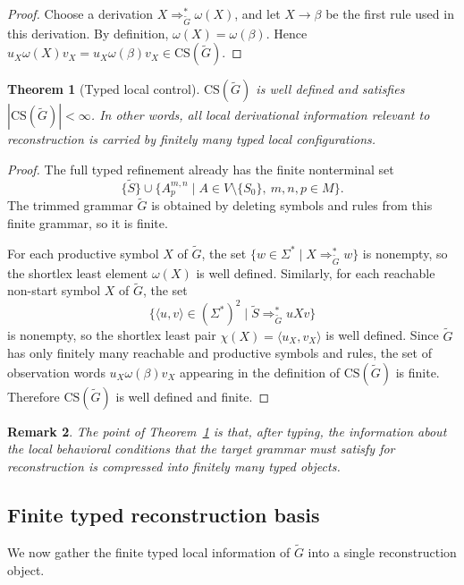 \documentclass[11pt,a4paper]{article}
\newtheorem{theorem}{Theorem}[section]
\newtheorem{remark}[theorem]{Remark}
\newcommand{\CS}{\mathrm{CS}}
\begin{document}
\begin{proof}
Choose a derivation $X\Rightarrow_{\widetilde G}^*\omega(X)$, and let $X\to\beta$ be the first rule used in this derivation. By definition, $\omega(X)=\omega(\beta)$. Hence $u_X\omega(X)v_X=u_X\omega(\beta)v_X\in\CS(\widetilde G)$.
\end{proof}

\begin{theorem}[Typed local control]\label{thm:typed-local-control}
$\CS(\widetilde G)$ is well defined and satisfies $|\CS(\widetilde G)|<\infty$. In other words, all local derivational information relevant to reconstruction is carried by finitely many typed local configurations.
\end{theorem}
\begin{proof}
The full typed refinement already has the finite nonterminal set
\[
  \{\widetilde S\}\cup
  \{A_p^{m,n}\mid A\in V\setminus\{S_0\},\ m,n,p\in M\}.
\]
The trimmed grammar $\widetilde G$ is obtained by deleting symbols and
rules from this finite grammar, so it is finite.

For each productive symbol $X$ of $\widetilde G$, the set
$\{w\in\Sigma^*\mid X\Rightarrow_{\widetilde G}^* w\}$ is nonempty, so
the shortlex least element $\omega(X)$ is well defined. Similarly, for
each reachable non-start symbol $X$ of $\widetilde G$, the set
\[
  \{\langle u,v\rangle\in(\Sigma^*)^2
    \mid \widetilde S\Rightarrow_{\widetilde G}^* uXv\}
\]
is nonempty, so the shortlex least pair
$\chi(X)=\langle u_X,v_X\rangle$ is well defined. Since $\widetilde G$
has only finitely many reachable and productive symbols and rules, the
set of observation words $u_X\omega(\beta)v_X$ appearing in the
definition of $\CS(\widetilde G)$ is finite. Therefore
$\CS(\widetilde G)$ is well defined and finite.
\end{proof}

\begin{remark}
The point of Theorem~\ref{thm:typed-local-control} is that, after typing, the information about the local behavioral conditions that the target grammar must satisfy for reconstruction is compressed into finitely many typed objects.
\end{remark}


\subsection{Finite typed reconstruction basis}

We now gather the finite typed local information of $\widetilde G$ into
a single reconstruction object.
\end{document}
